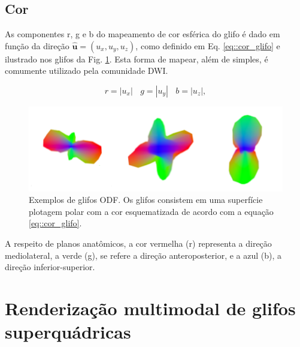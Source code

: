 \documentclass[
    12pt,                %
    oneside,            %
    a4paper,            %
    english,            %
    french,                %
    spanish,            %
    brazil                %
    ]{abntex2}
\begin{document}
\subsection{Cor}

As componentes r, g e b do mapeamento de cor esférica do glifo é dado em função da direção $\mathbf{\hat{u}} = (u_x, u_y, u_z)$, como definido em Eq. \ref{eq::cor_glifo} e ilustrado nos glifos da Fig. \ref{fig::glifo_ilustrado}. Esta forma de mapear, além de simples, é comumente utilizado pela comunidade DWI. %

\begin{equation}
\label{eq::cor_glifo}
    r = |u_x| ~~~~ g = |u_y| ~~~~ b = |u_z|, 
\end{equation}

\begin{figure}[ht]

    \centering
    \includegraphics[width=.8\linewidth, angle=0]{figs/Esquema_Glifo/Glifos3Ex.png}
    \caption{Exemplos de glifos ODF. Os glifos consistem em uma superfície plotagem polar com a cor esquematizada de acordo com a equação \ref{eq::cor_glifo}.}
    \label{fig::glifo_ilustrado}
   \hspace{1pt}
\end{figure}

A respeito de planos anatômicos, a cor vermelha (r) representa a direção mediolateral, a verde (g), se refere a direção anteroposterior, e a azul (b), a direção inferior-superior.

\section{Renderização multimodal de glifos superquádricas}
\label{sec::superquadricas}
\end{document}
